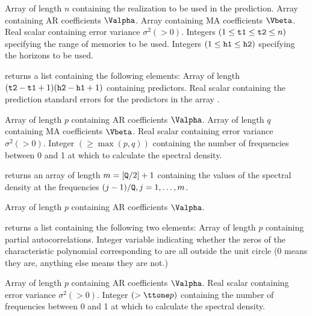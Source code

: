
\Sarg
{} Array of length $n$ containing the realization to be
used in the prediction.
 Array containing AR coefficients $\Valpha$.
 Array containing MA coefficients $\Vbeta$.
 Real scalar containing error variance $\sigma^2(>0)$.
 Integers $(1\le{\tt{t1}}\le{\tt{t2}}\le n)$
specifying the range of memories to be used.
 Integers $(1\le{\tt{h1}}\le{\tt{h2}})$ specifying
the horizons to be used.

\Sval
\Sitem{ }  returns a list containing the following
elements:
 Array of length $({\tt{t2}}-{\tt{t1}}+1)({\tt{h2}}-
{\tt{h1}}+1)$ containing predictors.
 Real scalar containing the prediction standard errors
for the predictors in the array {}.
%
%


\Sarg
{} Array of length $p$ containing AR coefficients $\Valpha$.
 Array of length $q$ containing MA coefficients $\Vbeta$.
 Real scalar containing error variance $\sigma^2(>0)$.
 Integer $(\ge\max(p,q))$ containing the number of
frequencies between 0 and 1 at which to calculate the spectral
density.

\Sval
\Sitem{ }  returns an array {} of length 
$m=[{\tt{Q}}/2]+1$ containing the values of the spectral density 
at the frequencies $(j-1)/{\tt{Q}},j=1,\ldots,m$.
%
%


\Sarg
{} Array of length $p$ containing AR coefficients $\Valpha$.

\Sval
\Sitem{ }  returns a list containing the following 
two elements:
 Array of length $p$ containing partial autocorrelations.
 Integer variable indicating whether the zeros of the
characteristic polynomial corresponding to {} are all
outside the unit circle (0 means they are, anything else means
they are not.)
%
%


\Sarg
{} Array of length $p$ containing AR coefficients $\Valpha$.
 Real scalar containing error variance $\sigma^2(>0)$.
 Integer $(>{\tsl{p}})$ containing the number of
frequencies between 0 and 1 at which to calculate the spectral
density. 

